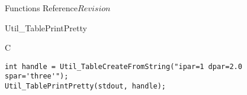 \begin{cactuspart}{ Functions Reference}{}{$Revision$}
\begin{FunctionDescription}{Util\_TablePrintPretty}
\begin{ExampleSection}
\begin{Example}{C}
\begin{verbatim}
int handle = Util_TableCreateFromString("ipar=1 dpar=2.0 spar='three'");
Util_TablePrintPretty(stdout, handle);
\end{verbatim}
\end{Example}
\end{ExampleSection}
\end{FunctionDescription}


\end{cactuspart}
